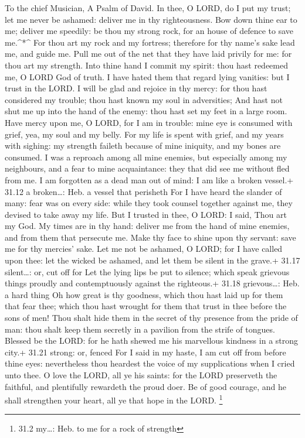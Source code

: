 To the chief Musician, A Psalm of David.  In thee, O LORD,
do I put my trust; let me never be ashamed: deliver me in thy
righteousness.  Bow down thine ear to me; deliver me
speedily: be thou my strong rock, for an house of defence to save
me.\^{}*\^{}  For thou art my rock and my fortress;
therefore for thy name's sake lead me, and guide me.  Pull
me out of the net that they have laid privily for me: for thou art my
strength.  Into thine hand I commit my spirit: thou hast
redeemed me, O LORD God of truth.  I have hated them that
regard lying vanities: but I trust in the LORD.  I will be
glad and rejoice in thy mercy: for thou hast considered my trouble; thou
hast known my soul in adversities;  And hast not shut me up
into the hand of the enemy: thou hast set my feet in a large room.
 Have mercy upon me, O LORD, for I am in trouble: mine eye
is consumed with grief, yea, my soul and my belly.  For my
life is spent with grief, and my years with sighing: my strength faileth
because of mine iniquity, and my bones are consumed.  I was
a reproach among all mine enemies, but especially among my neighbours,
and a fear to mine acquaintance: they that did see me without fled from
me.  I am forgotten as a dead man out of mind: I am like a
broken vessel.+ 31.12 a broken\ldots: Heb. a vessel that perisheth
 For I have heard the slander of many: fear was on every
side: while they took counsel together against me, they devised to take
away my life.  But I trusted in thee, O LORD: I said, Thou
art my God.  My times are in thy hand: deliver me from the
hand of mine enemies, and from them that persecute me. 
Make thy face to shine upon thy servant: save me for thy mercies' sake.
 Let me not be ashamed, O LORD; for I have called upon
thee: let the wicked be ashamed, and let them be silent in the grave.+
31.17 silent\ldots: or, cut off for  Let the lying lips be
put to silence; which speak grievous things proudly and contemptuously
against the righteous.+ 31.18 grievous\ldots: Heb. a hard thing
 Oh how great is thy goodness, which thou hast laid up for
them that fear thee; which thou hast wrought for them that trust in thee
before the sons of men!  Thou shalt hide them in the secret
of thy presence from the pride of man: thou shalt keep them secretly in
a pavilion from the strife of tongues.  Blessed be the
LORD: for he hath shewed me his marvellous kindness in a strong city.+
31.21 strong: or, fenced  For I said in my haste, I am cut
off from before thine eyes: nevertheless thou heardest the voice of my
supplications when I cried unto thee.  O love the LORD, all
ye his saints: for the LORD preserveth the faithful, and plentifully
rewardeth the proud doer.  Be of good courage, and he shall
strengthen your heart, all ye that hope in the LORD. \footnote{31.2
  my\ldots: Heb. to me for a rock of strength}

